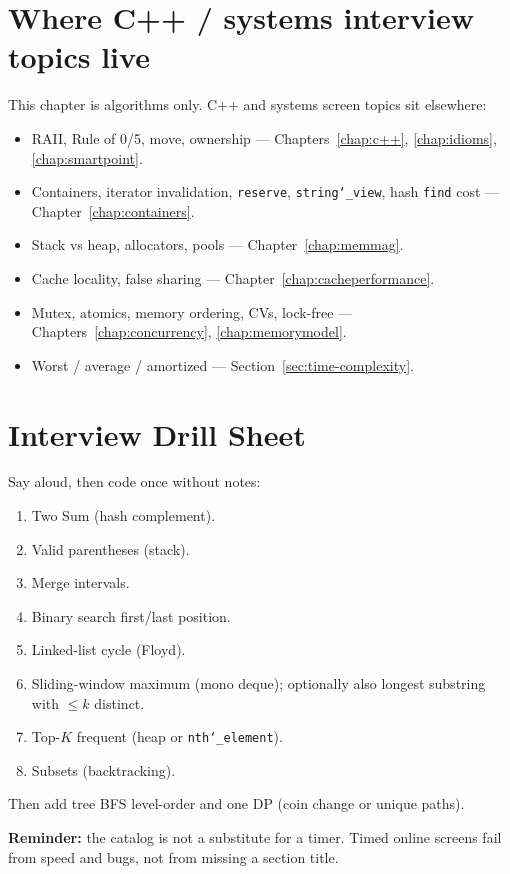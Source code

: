 \section{Where C++ / systems interview topics live}
\label{sec:pat-see-also}
This chapter is algorithms only. C++ and systems screen topics sit elsewhere:
\begin{itemize}
    \item RAII, Rule of 0/5, move, ownership --- Chapters~\ref{chap:c++},
          \ref{chap:idioms}, \ref{chap:smartpoint}.
    \item Containers, iterator invalidation, \texttt{reserve}, \texttt{string\char`_view},
          hash \texttt{find} cost --- Chapter~\ref{chap:containers}.
    \item Stack vs heap, allocators, pools --- Chapter~\ref{chap:memmag}.
    \item Cache locality, false sharing --- Chapter~\ref{chap:cacheperformance}.
    \item Mutex, atomics, memory ordering, CVs, lock-free ---
          Chapters~\ref{chap:concurrency}, \ref{chap:memorymodel}.
    \item Worst / average / amortized --- Section~\ref{sec:time-complexity}.
\end{itemize}

\section{Interview Drill Sheet}
\label{sec:pat-drill}
Say aloud, then code once without notes:
\begin{enumerate}
    \item Two Sum (hash complement).
    \item Valid parentheses (stack).
    \item Merge intervals.
    \item Binary search first/last position.
    \item Linked-list cycle (Floyd).
    \item Sliding-window maximum (mono deque); optionally also longest substring
          with $\le k$ distinct.
    \item Top-$K$ frequent (heap or \texttt{nth\char`_element}).
    \item Subsets (backtracking).
\end{enumerate}
Then add tree BFS level-order and one DP (coin change or unique paths).

\par\noindent\textbf{Reminder:} the catalog is not a substitute for a timer.
Timed online screens fail from speed and bugs, not from missing a section title.
